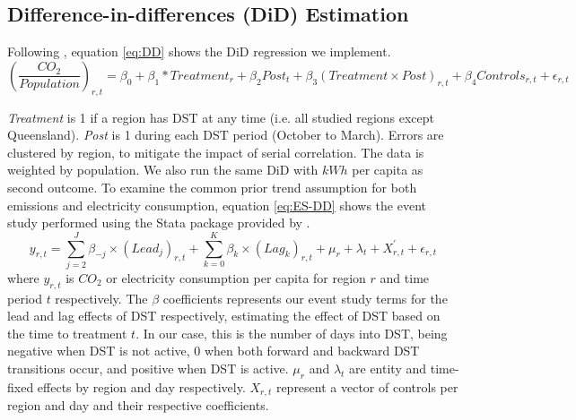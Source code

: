 \subsection{Difference-in-differences (DiD) Estimation}
Following \textcites{callaway_difference--differences_2021, goodman-bacon_difference--differences_2021}, equation \ref{eq:DD} shows the \ac{DiD} regression we implement.
\begin{equation}
    \left(\frac{CO_2}{Population}\right)_{r,t}
 = \beta_0 + \beta_1*Treatment_{r} + \beta_2Post_{t} + \beta_3(Treatment \times Post)_{r,t} + \beta_4 Controls_{r,t}
     + \epsilon_{r,t}
     \label{eq:DD}
\end{equation}

\textit{Treatment} is 1 if a region has \ac{DST} at any time (i.e. all studied regions except Queensland). \textit{Post} is 1 during each \ac{DST} period (October to March). Errors are clustered by region, to mitigate the impact of serial correlation. The data is weighted by population. We also run the same \ac{DiD} with $kWh$ per capita as second outcome.
To examine the common prior trend assumption for both emissions and electricity consumption, equation \ref{eq:ES-DD} shows the event study performed using the Stata package provided by \textcite{clarke_implementing_2021}.
\begin{equation}
    y_{r,t} = \sum_{j=2}^{J} \beta_{-j} \times (Lead_j)_{r,t} + \sum_{k=0}^K \beta_{k} \times (Lag_k)_{r,t} + \mu_r + \lambda_t + X^{'}_{r,t} + \epsilon_{r,t}
    \label{eq:ES-DD}
\end{equation}
where $y_{r,t}$ is $CO_2$ or electricity consumption per capita for region $r$ and time period $t$ respectively. The $\beta$ coefficients represents our event study terms for the lead and lag effects of DST respectively, estimating the effect of DST based on the time to treatment $t$. In our case, this is the number of days into DST, being negative when DST is not active, 0 when both forward and backward DST transitions occur, and positive when DST is active. $\mu_r$ and $\lambda_t$ are entity and time-fixed effects by region and day respectively. $X_{r,t}$ represent a vector of controls per region and day and their respective coefficients.  

